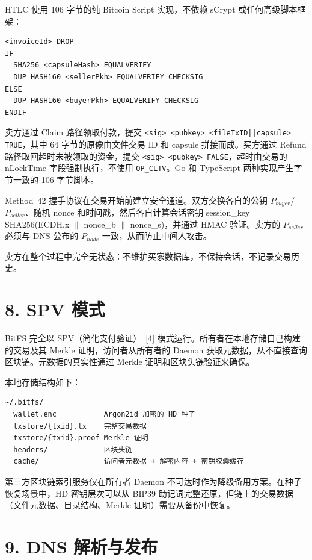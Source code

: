 \documentclass[11pt,a4paper]{article}
\begin{document}
HTLC 使用 106 字节的纯 Bitcoin Script 实现，不依赖 sCrypt 或任何高级脚本框架：

\begin{lstlisting}
<invoiceId> DROP
IF
  SHA256 <capsuleHash> EQUALVERIFY
  DUP HASH160 <sellerPkh> EQUALVERIFY CHECKSIG
ELSE
  DUP HASH160 <buyerPkh> EQUALVERIFY CHECKSIG
ENDIF
\end{lstlisting}

卖方通过 Claim 路径领取付款，提交 \texttt{<sig> <pubkey> <fileTxID||capsule> TRUE}，其中 64 字节的原像由文件交易 ID 和 capsule 拼接而成。买方通过 Refund 路径取回超时未被领取的资金，提交 \texttt{<sig> <pubkey> FALSE}，超时由交易的 nLockTime 字段强制执行，不使用 \texttt{OP\_CLTV}。Go 和 TypeScript 两种实现产生字节一致的 106 字节脚本。

Method~42 握手协议在交易开始前建立安全通道。双方交换各自的公钥 $P_{buyer}$/$P_{seller}$、随机 nonce 和时间戳，然后各自计算会话密钥 session\_key = SHA256(ECDH.x $\|$ nonce\_b $\|$ nonce\_s)，并通过 HMAC 验证。卖方的 $P_{seller}$ 必须与 DNS 公布的 $P_{node}$ 一致，从而防止中间人攻击。

卖方在整个过程中完全无状态：不维护买家数据库，不保持会话，不记录交易历史。

\section{8. SPV 模式}

BitFS 完全以 SPV（简化支付验证）~[4] 模式运行。所有者在本地存储自己构建的交易及其 Merkle 证明，访问者从所有者的 Daemon 获取元数据，从不直接查询区块链。元数据的真实性通过 Merkle 证明和区块头链验证来确保。

本地存储结构如下：

\begin{lstlisting}
~/.bitfs/
  wallet.enc           Argon2id 加密的 HD 种子
  txstore/{txid}.tx    完整交易数据
  txstore/{txid}.proof Merkle 证明
  headers/             区块头链
  cache/               访问者元数据 + 解密内容 + 密钥胶囊缓存
\end{lstlisting}

第三方区块链索引服务仅在所有者 Daemon 不可达时作为降级备用方案。在种子恢复场景中，HD 密钥层次可以从 BIP39 助记词完整还原，但链上的交易数据（文件元数据、目录结构、Merkle 证明）需要从备份中恢复。

\section{9. DNS 解析与发布}
\end{document}

